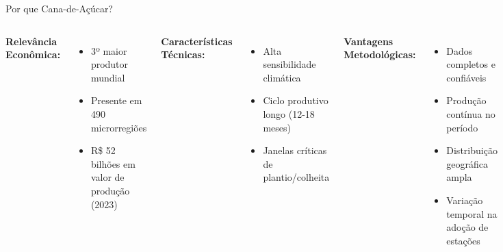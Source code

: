 \documentclass[10pt,aspectratio=169]{beamer}
\begin{document}
\begin{frame}{Por que Cana-de-Açúcar?}
\begin{columns}
\textbf{Relevância Econômica:}
\begin{itemize}
    \item 3º maior produtor mundial
    \item Presente em 490 microrregiões
    \item R\$ 52 bilhões em valor de produção (2023)
\end{itemize}

\textbf{Características Técnicas:}
\begin{itemize}
    \item Alta sensibilidade climática
    \item Ciclo produtivo longo (12-18 meses)
    \item Janelas críticas de plantio/colheita
\end{itemize}

\textbf{Vantagens Metodológicas:}
\begin{itemize}
    \item Dados completos e confiáveis
    \item Produção contínua no período
    \item Distribuição geográfica ampla
    \item Variação temporal na adoção de estações
\end{itemize}

\begin{alertblock}{Implicação}
Cultura ideal para identificar impactos de informação meteorológica
\end{alertblock}
\end{columns}
\end{frame}
\end{document}
